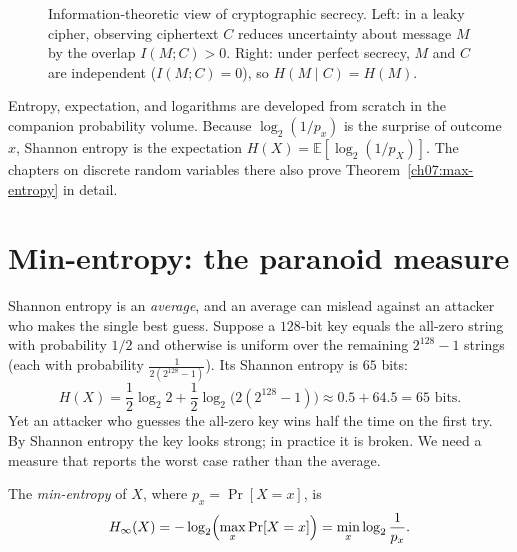 \begin{figure}[htbp]
\caption{Information-theoretic view of cryptographic secrecy. Left: in a leaky cipher, observing ciphertext $C$ reduces uncertainty about message $M$ by the overlap $I(M; C) > 0$. Right: under perfect secrecy, $M$ and $C$ are independent ($I(M; C) = 0$), so $H(M \mid C) = H(M)$.}
\label{ch07:fig-entropy-venn}
\end{figure}

\begin{connectionbox}
Entropy, expectation, and logarithms are developed from scratch in the companion probability volume. Because $\log_2(1/p_x)$ is the surprise of outcome $x$, Shannon entropy is the expectation $H(X) = \mathbb{E}[\log_2(1/p_X)]$. The chapters on discrete random variables there also prove Theorem~\ref{ch07:max-entropy} in detail.
\end{connectionbox}

\section{Min-entropy: the paranoid measure}

Shannon entropy is an \emph{average}, and an average can mislead against an attacker who makes the single best guess. Suppose a $128$-bit key equals the all-zero string with probability $1/2$ and otherwise is uniform over the remaining $2^{128} - 1$ strings (each with probability $\frac{1}{2(2^{128}-1)}$). Its Shannon entropy is $65$ bits:
\[
  H(X) = \frac{1}{2}\log_2 2 + \frac{1}{2}\log_2\!\bigl(2(2^{128}-1)\bigr) \approx 0.5 + 64.5 = 65\text{ bits}.
\]
Yet an attacker who guesses the all-zero key wins half the time on the first try. By Shannon entropy the key looks strong; in practice it is broken. We need a measure that reports the worst case rather than the average.

\begin{definition}
\label{ch07:min-entropy-def}
The \emph{min-entropy} of $X$, where $p_x = \Pr[X = x]$, is
\[
  H_\infty(X) = -\log_2 \Bigl( \max_x \Pr[X = x] \Bigr) = \min_x \log_2 \frac{1}{p_x}.
\]
\end{definition}

